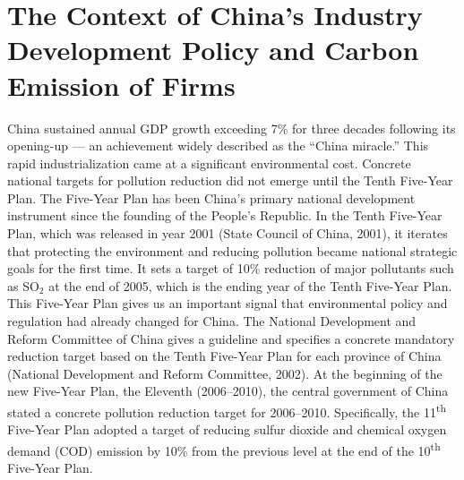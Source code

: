 \documentclass[11pt,a4paper]{article}
\begin{document}
\section{The Context of China's Industry Development Policy and Carbon Emission of Firms}

China sustained annual GDP growth exceeding 7\% for three decades following its opening-up --- an achievement widely described as the ``China miracle.'' This rapid industrialization came at a significant environmental cost. Concrete national targets for pollution reduction did not emerge until the Tenth Five-Year Plan. The Five-Year Plan has been China's primary national development instrument since the founding of the People's Republic. In the Tenth Five-Year Plan, which was released in year 2001 (State Council of China, 2001), it iterates that protecting the environment and reducing pollution became national strategic goals for the first time. It sets a target of 10\% reduction of major pollutants such as SO$_2$ at the end of 2005, which is the ending year of the Tenth Five-Year Plan. This Five-Year Plan gives us an important signal that environmental policy and regulation had already changed for China. The National Development and Reform Committee of China gives a guideline and specifies a concrete mandatory reduction target based on the Tenth Five-Year Plan for each province of China (National Development and Reform Committee, 2002). At the beginning of the new Five-Year Plan, the Eleventh (2006--2010), the central government of China stated a concrete pollution reduction target for 2006--2010. Specifically, the 11\textsuperscript{th} Five-Year Plan adopted a target of reducing sulfur dioxide and chemical oxygen demand (COD) emission by 10\% from the previous level at the end of the 10\textsuperscript{th} Five-Year Plan.
\end{document}
